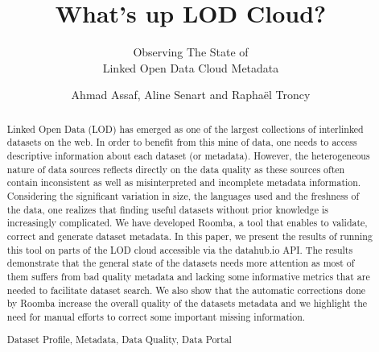 \documentclass[runningheads,a4paper]{llncs}
\newcommand{\keywords}[1]{\par\addvspace\baselineskip
\noindent\keywordname\enspace\ignorespaces#1}
\begin{document}
\title{What's up LOD Cloud?}
\subtitle{Observing The State of\\Linked Open Data Cloud Metadata}

\author{Ahmad Assaf, Aline Senart and Rapha\"{e}l Troncy }



\maketitle


\begin{abstract}
Linked Open Data (LOD) has emerged as one of the largest collections of interlinked datasets on the web. In order to benefit from this mine of data, one needs to access descriptive information about each dataset (or metadata). However, the heterogeneous nature of data sources reflects directly on the data quality as these sources often contain inconsistent as well as misinterpreted and incomplete metadata information. Considering the significant variation in size, the languages used and the freshness of the data, one realizes that finding useful datasets without prior knowledge is increasingly complicated. We have developed Roomba, a tool that enables to validate, correct and generate dataset metadata. In this paper, we present the results of running this tool on parts of the LOD cloud accessible via the datahub.io API. The results demonstrate that the general state of the datasets needs more attention as most of them suffers from bad quality metadata and lacking some informative metrics that are needed to facilitate dataset search. We also show that the automatic corrections done by Roomba increase the overall quality of the datasets metadata and we highlight the need for manual efforts to correct some important missing information.

\keywords{Dataset Profile, Metadata, Data Quality, Data Portal}
\end{abstract}

\end{document}
